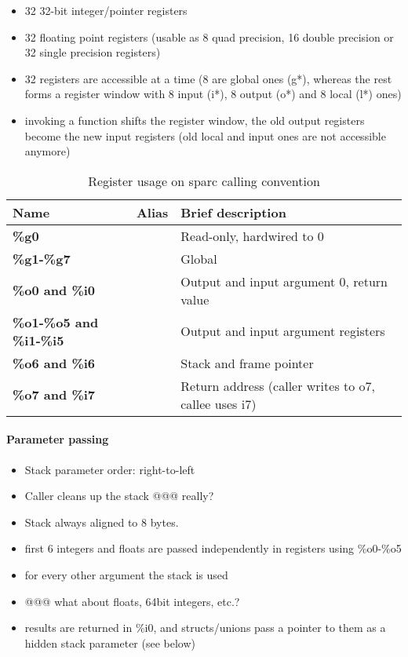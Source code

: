 \begin{itemize}
\item 32 32-bit integer/pointer registers
\item 32 floating point registers (usable as 8 quad precision, 16 double precision or 32 single precision registers)
\item 32 registers are accessible at a time (8 are global ones (g*), whereas the rest forms a register window with 8 input (i*), 8 output (o*) and 8 local (l*) ones)
\item invoking a function shifts the register window, the old output registers become the new input registers (old local and input ones are not accessible anymore)
\end{itemize}

\begin{table}[h]
\begin{tabular*}{0.95\textwidth}{lll}
Name                                 & Alias                   & Brief description\\
\hline
{\bf \%g0}                           &                         & Read-only, hardwired to 0 \\
{\bf \%g1-\%g7}                      &                         & Global \\
{\bf \%o0 and \%i0}                  &                         & Output and input argument 0, return value \\
{\bf \%o1-\%o5 and \%i1-\%i5}        &                         & Output and input argument registers \\
{\bf \%o6 and \%i6}                  &                         & Stack and frame pointer \\
{\bf \%o7 and \%i7}                  &                         & Return address (caller writes to o7, callee uses i7) \\
\end{tabular*}
\caption{Register usage on sparc calling convention}
\end{table}

\paragraph{Parameter passing}
\begin{itemize}
\item Stack parameter order: right-to-left
\item Caller cleans up the stack @@@ really?
\item Stack always aligned to 8 bytes.
\item first 6 integers and floats are passed independently in registers using \%o0-\%o5
\item for every other argument the stack is used
\item @@@ what about floats, 64bit integers, etc.?
\item results are returned in \%i0, and structs/unions pass a pointer to them as a hidden stack parameter (see below)
\end{itemize}

